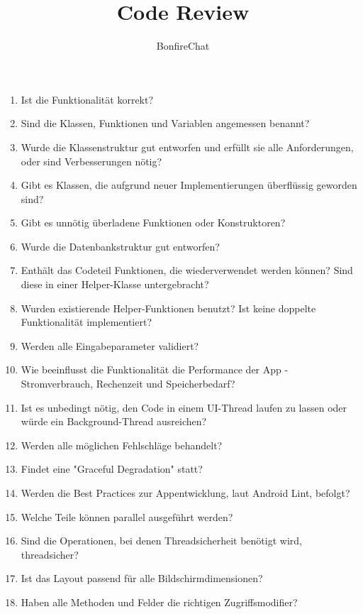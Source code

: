 \documentclass[accentcolor=tud2d,12pt,paper=a4,colorbacktitle]{tudexercise}
\title{Code Review}
\subtitle{BonfireChat}
\begin{document}
  \maketitle

  \begin{enumerate}[ 1.]
    \item Ist die Funktionalität korrekt?
    \item Sind die Klassen, Funktionen und Variablen angemessen benannt?
    \item Wurde die Klassenstruktur gut entworfen und erfüllt sie alle Anforderungen, oder sind Verbesserungen nötig?
    \item Gibt es Klassen, die aufgrund neuer Implementierungen überflüssig geworden sind?
    \item Gibt es unnötig überladene Funktionen oder Konstruktoren?
    \item Wurde die Datenbankstruktur gut entworfen?
    \item Enthält das Codeteil Funktionen, die wiederverwendet werden können? Sind diese in einer Helper-Klasse untergebracht?
    \item Wurden existierende Helper-Funktionen benutzt? Ist keine doppelte Funktionalität implementiert?
    \item Werden alle Eingabeparameter validiert?
    \item Wie beeinflusst die Funktionalität die Performance der App - Stromverbrauch, Rechenzeit und Speicherbedarf?
    \item Ist es unbedingt nötig, den Code in einem UI-Thread laufen zu lassen oder würde ein Background-Thread ausreichen?
    \item Werden alle möglichen Fehlschläge behandelt?
    \item Findet eine "Graceful Degradation" statt?
    \item Werden die Best Practices zur Appentwicklung, laut Android Lint, befolgt?
    \item Welche Teile können parallel ausgeführt werden?
    \item Sind die Operationen, bei denen Threadsicherheit benötigt wird, threadsicher?
    \item Ist das Layout passend für alle Bildschirmdimensionen?
    \item Haben alle Methoden und Felder die richtigen Zugriffsmodifier?
  \end{enumerate}
\end{document}
